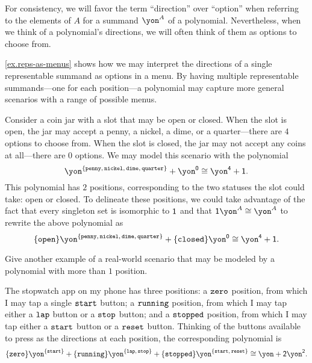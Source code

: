 \documentclass[Book-Poly]{subfiles}
\begin{document}
For consistency, we will favor the term ``direction'' over ``option'' when referring to the elements of $A$ for a summand $\yon^A$ of a polynomial.
Nevertheless, when we think of a polynomial's directions, we will often think of them as options to choose from.

\cref{ex.reps-as-menus} shows how we may interpret the directions of a single representable summand as options in a menu.
By having multiple representable summands---one for each position---a polynomial may capture more general scenarios with a range of possible menus.

\begin{example} \label{ex.coin-jar}
    Consider a coin jar with a slot that may be open or closed.
    When the slot is open, the jar may accept a penny, a nickel, a dime, or a quarter---there are $4$ options to choose from.
    When the slot is closed, the jar may not accept any coins at all---there are $0$ options.
    We may model this scenario with the polynomial
    \[
        \yon^{\{\const{penny},\,\const{nickel},\,\const{dime},\,\const{quarter}\}}+\yon^\0 \iso \yon^\4+\1.
    \]
    This polynomial has $2$ positions, corresponding to the two statuses the slot could take: open or closed.
    To delineate these positions, we could take advantage of the fact that every singleton set is isomorphic to $\textsf{1}$ and that $\1\yon^A\iso\yon^A$ to rewrite the above polynomial as
    \[
        \{\const{open}\}\yon^{\{\const{penny},\,\const{nickel},\,\const{dime},\,\const{quarter}\}}+\{\const{closed}\}\yon^\0 \iso \yon^\4+\1.
    \]
\end{example}

\begin{exercise}
    Give another example of a real-world scenario that may be modeled by a polynomial with more than $1$ position.
\begin{solution}
    The stopwatch app on my phone has three positions: a $\texttt{zero}$ position, from which I may tap a single $\texttt{start}$ button; a $\texttt{running}$ position, from which I may tap either a $\texttt{lap}$ button or a $\texttt{stop}$ button; and a $\texttt{stopped}$ position, from which I may tap either a $\texttt{start}$ button or a $\texttt{reset}$ button.
    Thinking of the buttons available to press as the directions at each position, the corresponding polynomial is
    \[
        \{\const{zero}\}\yon^{\{\const{start}\}}+\{\const{running}\}\yon^{\{\const{lap},\,\const{stop}\}}+\{\const{stopped}\}\yon^{\{\const{start},\, \const{reset}\}}\iso\yon+\2\yon^\2.
    \]
\end{solution}
\end{exercise}
\end{document}
